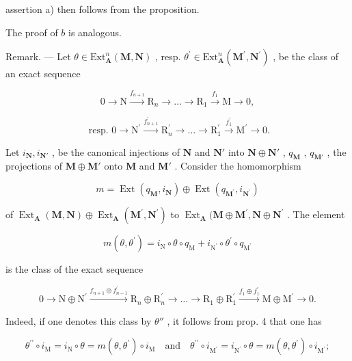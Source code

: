 assertion a) then follows from the proposition.

The proof of \(b\) is analogous.

Remark. --- Let \(\theta\in\mathrm{Ext}_{\mathbf{A}}^{n}(\mathbf{M},\mathbf{N})\) , resp. \(\theta^{\prime}\in\mathrm{Ext}_{\mathbf{A}}^{n}(\mathbf{M}^{\prime},\mathbf{N}^{\prime})\) , be the class of an exact sequence

\[
0 \rightarrow \mathrm{N} \xrightarrow {f _ {n + 1}} \mathrm{R} _ {n} \rightarrow \dots \rightarrow \mathrm{R} _ {1} \xrightarrow {f _ {1}} \mathrm{M} \rightarrow 0,
\]

\[
\text { resp. } 0 \to \mathrm{N} ^ {\prime} \xrightarrow {f _ {n + 1} ^ {\prime}} \mathrm{R} _ {n} ^ {\prime} \to \dots \to \mathrm{R} _ {1} ^ {\prime} \xrightarrow {f _ {1} ^ {\prime}} \mathrm{M} ^ {\prime} \to 0.
\]

Let \(i_{\mathbf{N}}, i_{\mathbf{N}'}\) , be the canonical injections of \(\mathbf{N}\) and \(\mathbf{N}'\) into \(\mathbf{N} \oplus \mathbf{N}'\) , \(q_{\mathbf{M}}\) , \(q_{\mathbf{M}'}\) , the projections of \(\mathbf{M} \oplus \mathbf{M}'\) onto \(\mathbf{M}\) and \(\mathbf{M}'\) . Consider the homomorphism

\[
m = \operatorname{Ext} \left(q _ {\mathbf {M}}, i _ {\mathbf {N}}\right) \oplus \operatorname{Ext} \left(q _ {\mathbf {M} ^ {\prime}}, i _ {\mathbf {N} ^ {\prime}}\right)
\]

of \(\operatorname{Ext}_{\mathbf{A}}(\mathbf{M},\mathbf{N})\oplus \operatorname{Ext}_{\mathbf{A}}(\mathbf{M}^{\prime},\mathbf{N}^{\prime})\) to \(\operatorname{Ext}_{\mathbf{A}}(\mathbf{M}\oplus \mathbf{M}^{\prime},\mathbf{N}\oplus \mathbf{N}^{\prime}\) . The element

\[
m (\theta , \theta^ {\prime}) = i _ {\mathrm{N}} \circ \theta \circ q _ {\mathrm{M}} + i _ {\mathrm {N^ {\prime}}} \circ \theta^ {\prime} \circ q _ {\mathrm {M^ {\prime}}}
\]

is the class of the exact sequence

\[
0 \rightarrow \mathrm{N} \oplus \mathrm{N} ^ {\prime} \xrightarrow {f _ {n + 1} \oplus f _ {n - 1} ^ {\prime}} \mathrm{R} _ {n} \oplus \mathrm{R} _ {n} ^ {\prime} \rightarrow \dots \rightarrow \mathrm{R} _ {1} \oplus \mathrm{R} _ {1} ^ {\prime} \xrightarrow {f _ {1} \oplus f _ {1} ^ {\prime}} \mathrm{M} \oplus \mathrm{M} ^ {\prime} \rightarrow 0.
\]

Indeed, if one denotes this class by \(\theta''\) , it follows from prop. 4 that one has

\[
\theta^ {\prime \prime} \circ i _ {\mathrm{M}} = i _ {\mathrm{N}} \circ \theta = m (\theta , \theta^ {\prime}) \circ i _ {\mathrm{M}} \quad \text {and} \quad \theta^ {\prime \prime} \circ i _ {\mathrm{M} ^ {\prime}} = i _ {\mathrm{N} ^ {\prime}} \circ \theta = m (\theta , \theta^ {\prime}) \circ i _ {\mathrm{M} ^ {\prime}};
\]

